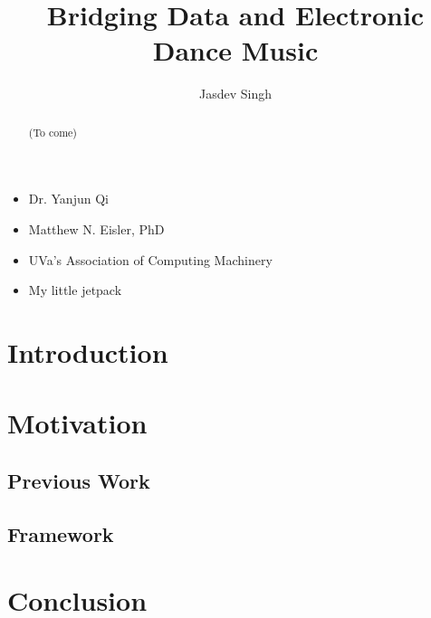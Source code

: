 \documentclass[12pt]{dalcsthesis}
\begin{document}
\mcs 
\title{Bridging Data and Electronic Dance Music}
\author{Jasdev Singh}


\nolistoftables
\nolistoffigures

\frontmatter

\begin{abstract}
(To come)
\end{abstract}

\begin{acknowledgements}
\begin{itemize}
	\item Dr. Yanjun Qi
	\item Matthew N. Eisler, PhD
	\item UVa's Association of Computing Machinery
	\item My little jetpack
\end{itemize}
\end{acknowledgements}

\mainmatter

\chapter{Introduction}

\chapter{Motivation}

\section{Previous Work}

\section{Framework}

\chapter{Conclusion}



\end{document}
